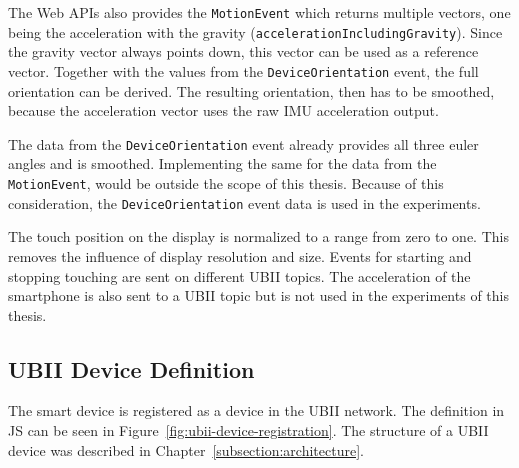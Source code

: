 The Web \acp{API} also provides the \lstinline{MotionEvent} which returns multiple vectors, one being the acceleration with the gravity (\lstinline{accelerationIncludingGravity}). Since the gravity vector always points down, this vector can be used as a reference vector. Together with the values from the \lstinline{DeviceOrientation} event, the full orientation can be derived. The resulting orientation, then has to be smoothed, because the acceleration vector uses the raw \ac{IMU} acceleration output. %

The data from the \lstinline{DeviceOrientation} event already provides all three euler angles and is smoothed. Implementing the same for the data from the \lstinline{MotionEvent}, would be outside the scope of this thesis. Because of this consideration, the \lstinline{DeviceOrientation} event data is used in the experiments. %

The touch position on the display is normalized to a range from zero to one. This removes the influence of display resolution and size. Events for starting and stopping touching are sent on different \ac{UBII} topics. The acceleration of the smartphone is also sent to a \ac{UBII} topic but is not used in the experiments of this thesis. %


\subsection{UBII Device Definition}\label{subsection:ubii-device-definition}

The smart device is registered as a device in the \ac{UBII} network. The definition in \ac{JS} can be seen in Figure~\ref{fig:ubii-device-registration}. The structure of a \ac{UBII} device was described in Chapter~\ref{subsection:architecture}. 

